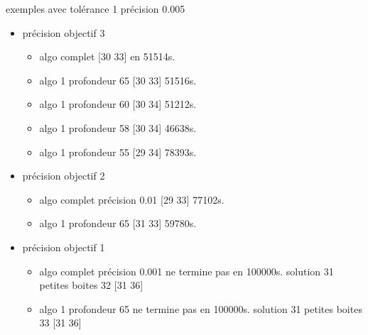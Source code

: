 \documentclass{article}
\begin{document}
exemples avec tol\'erance 1  pr\'ecision 0.005
\begin{itemize}
\item pr\'ecision objectif 3
\begin{itemize}
\item algo complet [30 33] en 51514s.
\item algo 1 profondeur 65 [30 33] 51516s.
\item algo 1 profondeur 60 [30 34] 51212s.
\item algo 1 profondeur 58 [30 34] 46638s.
\item algo 1 profondeur 55 [29 34] 78393s.

\end{itemize}
\item pr\'ecision objectif 2
\begin{itemize}
\item algo complet pr\'ecision 0.01 [29 33] 77102s.
\item algo 1 profondeur 65 [31 33]  59780s.
\end{itemize}
\item pr\'ecision objectif 1
\begin{itemize}
\item algo complet pr\'ecision 0.001 ne termine pas en 100000s.  solution 31 petites boites 32  [31 36]
\item algo 1 profondeur 65 ne termine pas en 100000s.  solution 31 petites boites 33  [31 36]

\end{itemize}
\end{itemize}
\end{document}
